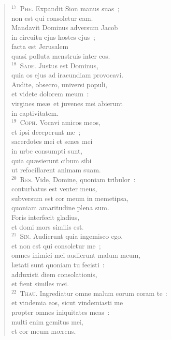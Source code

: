\begin{flushleft}
\begin{verse}
${}^{17}$~\textsc{Phe.} Expandit Sion manus suas~;\\ non est qui consoletur eam.\\ Mandavit Dominus adversum Jacob\\ in circuitu ejus hostes ejus~;\\ facta est Jerusalem\\ quasi polluta menstruis inter eos.\\
${}^{18}$~\textsc{Sade.} Justus est Dominus,\\ quia os ejus ad iracundiam provocavi.\\ Audite, obsecro, universi populi,\\ et videte dolorem meum~:\\ virgines me\ae\ et juvenes mei abierunt\\ in captivitatem.\\
${}^{19}$~\textsc{Coph.} Vocavi amicos meos,\\ et ipsi deceperunt me~;\\ sacerdotes mei et senes mei\\ in urbe consumpti sunt,\\ quia qu\ae sierunt cibum sibi\\ ut refocillarent animam suam.\\
${}^{20}$~\textsc{Res.} Vide, Domine, quoniam tribulor~:\\ conturbatus est venter meus,\\ subversum est cor meum in memetipsa,\\ quoniam amaritudine plena sum.\\ Foris interfecit gladius,\\ et domi mors similis est.\\
${}^{21}$~\textsc{Sin.} Audierunt quia ingemisco ego,\\ et non est qui consoletur me~;\\ omnes inimici mei audierunt malum meum,\\ l\ae tati sunt quoniam tu fecisti~:\\ adduxisti diem consolationis,\\ et fient similes mei.\\
${}^{22}$~\textsc{Thau.} Ingrediatur omne malum eorum coram te~:\\ et vindemia eos, sicut vindemiasti me\\ propter omnes iniquitates meas~:\\ multi enim gemitus mei,\\ et cor meum mœrens.\end{verse}\end{flushleft}


